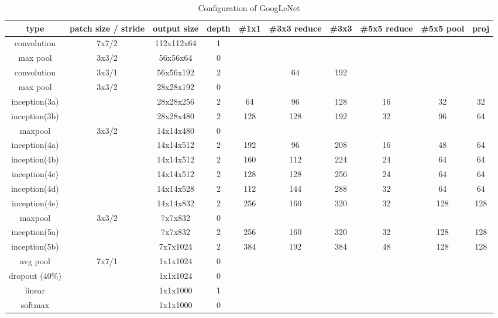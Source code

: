 \begin{table}[h]
  \centering
  \caption{Configuration of GoogLeNet}
  \footnotesize
    \begin{tabular}{|c|c|c|c|c|c|c|c|c|c|}
    \hline
    type  & patch size / stride & output size & depth & \#1x1 & \#3x3 reduce & \#3x3 & \#5x5 reduce & \#5x5 pool & proj \\\hline
    convolution & 7x7/2 & 112x112x64 & 1     &       &       &       &       &       &  \\\hline
    max pool & 3x3/2 & 56x56x64 & 0     &       &       &       &       &       &  \\\hline
    convolution & 3x3/1 & 56x56x192 & 2     &       & 64    & 192   &       &       &  \\\hline
    max pool & 3x3/2 & 28x28x192 & 0     &       &       &       &       &       &  \\\hline
    inception(3a) &       & 28x28x256 & 2     & 64    & 96    & 128   & 16    & 32    & 32 \\\hline
    inception(3b) &       & 28x28x480 & 2     & 128   & 128   & 192   & 32    & 96    & 64 \\\hline
    maxpool & 3x3/2 & 14x14x480 & 0     &       &       &       &       &       &  \\\hline
    inception(4a) &       & 14x14x512 & 2     & 192   & 96    & 208   & 16    & 48    & 64 \\\hline
    inception(4b) &       & 14x14x512 & 2     & 160   & 112   & 224   & 24    & 64    & 64 \\\hline
    inception(4c) &       & 14x14x512 & 2     & 128   & 128   & 256   & 24    & 64    & 64 \\\hline
    inception(4d) &       & 14x14x528 & 2     & 112   & 144   & 288   & 32    & 64    & 64 \\\hline
    inception(4e) &       & 14x14x832 & 2     & 256   & 160   & 320   & 32    & 128   & 128 \\\hline
    maxpool & 3x3/2 & 7x7x832 & 0     &       &       &       &       &       &  \\\hline
    inception(5a) &       & 7x7x832 & 2     & 256   & 160   & 320   & 32    & 128   & 128 \\\hline
    inception(5b) &       & 7x7x1024 & 2     & 384   & 192   & 384   & 48    & 128   & 128 \\\hline
    avg pool & 7x7/1 & 1x1x1024 & 0     &       &       &       &       &       &  \\\hline
    dropout (40\%) &       & 1x1x1024 & 0     &       &       &       &       &       &  \\\hline
    linear &       & 1x1x1000 & 1     &       &       &       &       &       &  \\\hline
    softmax &       & 1x1x1000 & 0     &       &       &       &       &       &  \\\hline
    \end{tabular}%
  \label{tab:cnn:googlenet}%
\end{table}%
